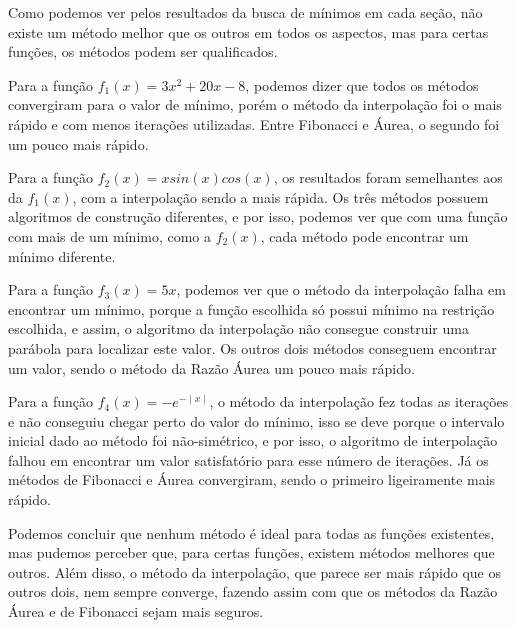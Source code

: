Como podemos ver pelos resultados da busca de mínimos em cada seção, não existe um método melhor que os outros em todos os aspectos, mas para certas funções, os métodos podem ser qualificados.
\\

\par Para a função $ f_1(x) = 3x^2 + 20x - 8 $, podemos dizer que todos os métodos convergiram para o valor de mínimo, porém o método da interpolação foi o mais rápido e com menos iterações utilizadas. Entre Fibonacci e Áurea, o segundo foi um pouco mais rápido.
\\

\par Para a função $ f_2(x) = xsin(x)cos(x) $, os resultados foram semelhantes aos da $ f_1(x) $, com a interpolação sendo a mais rápida. Os três métodos possuem algoritmos de construção diferentes, e por isso, podemos ver que com uma função com mais de um mínimo, como a $ f_2(x) $, cada método pode encontrar um mínimo diferente.
\\

\par Para a função $ f_3(x) = 5x $, podemos ver que o método da interpolação falha em encontrar um mínimo, porque a função escolhida só possui mínimo na restrição escolhida, e assim, o algoritmo da interpolação não consegue construir uma parábola para localizar este valor. Os outros dois métodos conseguem encontrar um valor, sendo o método da Razão Áurea um pouco mais rápido.
\\

\par Para a função $ f_4(x) = -e^{-\mid x \mid} $, o método da interpolação fez todas as iterações e não conseguiu chegar perto do valor do mínimo, isso se deve porque o intervalo inicial dado ao método foi não-simétrico, e por isso, o algoritmo de interpolação falhou em encontrar um valor satisfatório para esse número de iterações. Já os métodos de Fibonacci e Áurea convergiram, sendo o primeiro ligeiramente mais rápido.
\\

\par Podemos concluir que nenhum método é ideal para todas as funções existentes, mas pudemos perceber que, para certas funções, existem métodos melhores que outros. Além disso, o método da interpolação, que parece ser mais rápido que os outros dois, nem sempre converge, fazendo assim com que os métodos da Razão Áurea e de Fibonacci sejam mais seguros.
